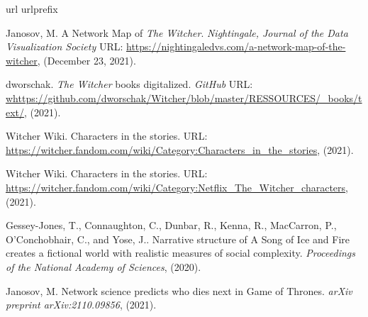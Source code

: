 \documentclass[fleqn,12pt]{wlscirep}
\begin{document}
\begin{thebibliography}{10}
\expandafter\ifx\csname url\endcsname\relax
  \def\url#1{\texttt{#1}}\fi
\expandafter\ifx\csname urlprefix\endcsname\relax\def\urlprefix{URL }\fi
\providecommand{\bibinfo}[2]{#2}
\providecommand{\eprint}[2][]{\url{#2}}






 \bibinfo{author}{Janosov, M.} \bibinfo{title}{A Network Map of {\it The Witcher}.}
    \newblock \emph{\bibinfo{journal}{Nightingale, Journal of the Data Visualization Society}} 
    \newblock \bibinfo{note}{URL: \href{https://nightingaledvs.com/a-network-map-of-the-witcher}{https://nightingaledvs.com/a-network-map-of-the-witcher}},  (\bibinfo{year}{December 23, 2021}). 


 \bibinfo{author}{dworschak.} \bibinfo{title}{{\it The Witcher} books digitalized.}
    \newblock \emph{\bibinfo{journal}{GitHub}} 
    \newblock \bibinfo{note}{URL: \href{https://github.com/dworschak/Witcher/blob/master/RESSOURCES/\_books/}{whttps://github.com/dworschak/Witcher/blob/master/RESSOURCES/\_books/text/}},  (\bibinfo{year}{2021}). 

 \bibinfo{author}{Witcher Wiki.} \bibinfo{title}{Characters in the stories.}
    \newblock 
    \newblock \bibinfo{note}{URL: \href{https://witcher.fandom.com/wiki/Category:Characters\_in\_the\_stories}{https://witcher.fandom.com/wiki/Category:Characters\_in\_the\_stories}}, (\bibinfo{year}{2021}).

 \bibinfo{author}{Witcher Wiki.} \bibinfo{title}{Characters in the stories.}
    \newblock 
    \newblock \bibinfo{note}{URL: \href{https://witcher.fandom.com/wiki/Category:Netflix\_The_Witcher\_characters}{https://witcher.fandom.com/wiki/Category:Netflix\_The\_Witcher\_characters}}, (\bibinfo{year}{2021}).

 \bibinfo{author}{Gessey-Jones, T., Connaughton, C., Dunbar, R., Kenna, R., MacCarron, P., O’Conchobhair, C., and Yose, J.}.
    \newblock \bibinfo{title}{Narrative structure of A Song of Ice and Fire creates a fictional world with realistic measures of social complexity}.
    \newblock \emph{\bibinfo{journal}{Proceedings of the National Academy of Sciences}},
    (\bibinfo{year}{2020}).

 \bibinfo{author}{Janosov, M}.
    \newblock \bibinfo{title}{Network science predicts who dies next in Game of Thrones.}
    \newblock \emph{\bibinfo{journal}{arXiv preprint arXiv:2110.09856}},
    (\bibinfo{year}{2021}).


\end{thebibliography}
\end{document}
